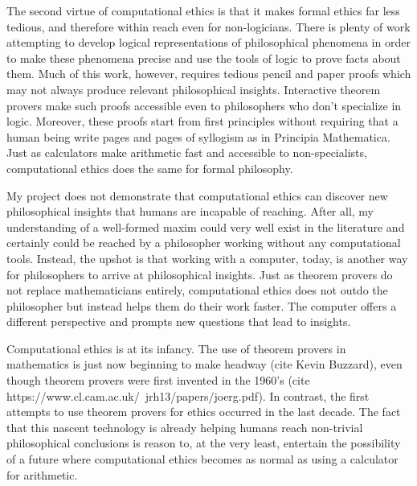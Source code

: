 \begin{isabellebody}
\begin{isamarkuptext}
The second virtue of computational ethics is that it makes formal ethics far less tedious, and therefore 
within reach even for non-logicians. There is plenty of work attempting to develop logical representations 
of philosophical phenomena in order to make these phenomena precise and use the tools of logic to prove 
facts about them. Much of this work, however, requires tedious pencil and paper proofs which may not 
always produce relevant philosophical insights. Interactive theorem provers make such proofs accessible 
even to philosophers who don't specialize in logic. Moreover, these proofs start from first principles 
without requiring that a human being write pages and pages of syllogism as in Principia Mathematica. 
Just as calculators make arithmetic fast and accessible to non-specialists, computational ethics does the same for 
formal philosophy.%
\end{isamarkuptext}\isamarkuptrue%
%
\isadelimdocument
%
\endisadelimdocument
%
\isatagdocument
%
\isamarkuptrue%
%
\endisatagdocument
{\isafolddocument}%
%
\isadelimdocument
%
\endisadelimdocument
%
\begin{isamarkuptext}%
My project does not demonstrate that computational ethics can discover new philosophical 
insights that humans are incapable of reaching. After all, my understanding of a well-formed maxim could 
very well exist in the literature and certainly could be reached by a philosopher working without any 
computational tools. Instead, the upshot is that working with a computer, today, is another way for 
philosophers to arrive at philosophical insights. Just as theorem provers do not replace mathematicians 
entirely, computational ethics does not outdo the philosopher but instead helps them do their work faster. 
The computer offers a different perspective and prompts new questions that lead to insights. 


Computational ethics is at its infancy. The use of theorem provers in mathematics is just now beginning 
to make headway (cite Kevin Buzzard), even though theorem provers were first invented in the 1960's (cite 
https://www.cl.cam.ac.uk/~jrh13/papers/joerg.pdf). In contrast, the first attempts to use theorem 
provers for ethics occurred in the last decade. The fact that this nascent technology is already 
helping humans reach non-trivial philosophical conclusions is reason to, at the very least, entertain 
the possibility of a future where computational ethics becomes as normal as using a calculator for arithmetic.


\end{isamarkuptext}
\end{isabellebody}
